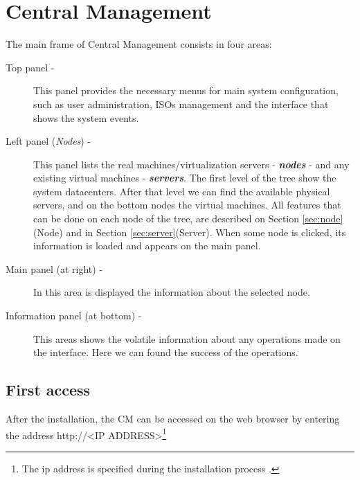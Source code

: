 
\chapter{\textsf{Central Management}}

The main frame of Central Management consists in four areas:

\begin{description}
	\item[Top panel -] This panel provides the necessary menus for main system configuration, such as user administration, ISOs management and the interface that shows the system events.
	\item[Left panel (\emph{Nodes}) -] This panel lists the real machines/virtualization servers - {\bf\emph{nodes}} - and any existing virtual machines - {\bf\emph{servers}}. The first level of the tree show the system datacenters. After that level we can find the available physical servers, and on the bottom nodes the virtual machines. All features that can be done on each node of the tree, are described on Section \ref{sec:node}(Node) and in Section \ref{sec:server}(Server). When some node is clicked, its information is loaded and appears on the main panel.
	\item[Main panel (at right) -] In this area is displayed the information about the selected node.
	\item[Information panel (at bottom) -] This areas shows the volatile information about any operations made on the interface. Here we can found the success of the operations.
\end{description}


\pagebreak


\section{First access}
\label{sec:first_access}
After the installation, the CM can be accessed on the web browser by entering the address http://<IP ADDRESS>\footnote{The ip address is specified during the installation process
.}

